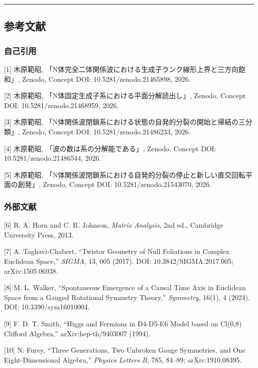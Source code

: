 \documentclass[
  a4paper,
]{ltjsarticle}
\begin{document}
\begin{center}\rule{0.5\linewidth}{0.5pt}\end{center}

\subsection{参考文献}\label{ux53c2ux8003ux6587ux732e}

\subsubsection{自己引用}\label{ux81eaux5df1ux5f15ux7528}

{[}1{]} 木原範昭,
「N体完全二体関係波における生成子ランク線形上界と三方向飽和」, Zenodo,
Concept DOI: 10.5281/zenodo.21465898, 2026.

{[}2{]} 木原範昭, 「N体固定生成子系における平面分解読出し」, Zenodo,
Concept DOI: 10.5281/zenodo.21468959, 2026.

{[}3{]} 木原範昭,
「N体関係波閉鎖系における状態の自発的分裂の開始と帰結の三分類」, Zenodo,
Concept DOI: 10.5281/zenodo.21486233, 2026.

{[}4{]} 木原範昭, 「波の数は系の分解能である」, Zenodo, Concept DOI:
10.5281/zenodo.21486544, 2026.

{[}5{]} 木原範昭,
「N体関係波閉鎖系における自発的分裂の停止と新しい直交回転平面の創発」,
Zenodo, Concept DOI: 10.5281/zenodo.21543070, 2026.

\subsubsection{外部文献}\label{ux5916ux90e8ux6587ux732e}

{[}6{]} R. A. Horn and C. R. Johnson, \emph{Matrix Analysis}, 2nd ed.,
Cambridge University Press, 2013.

{[}7{]} A. Taghavi-Chabert, ``Twistor Geometry of Null Foliations in
Complex Euclidean Space,'' \emph{SIGMA}, 13, 005 (2017). DOI:
10.3842/SIGMA.2017.005; arXiv:1505.06938.

{[}8{]} M. L. Walker, ``Spontaneous Emergence of a Causal Time Axis in
Euclidean Space from a Gauged Rotational Symmetry Theory,''
\emph{Symmetry}, 16(1), 4 (2024). DOI: 10.3390/sym16010004.

{[}9{]} F. D. T. Smith, ``Higgs and Fermions in D4-D5-E6 Model based on
Cl(0,8) Clifford Algebra,'' arXiv:hep-th/9403007 (1994).

{[}10{]} N. Furey, ``Three Generations, Two Unbroken Gauge Symmetries,
and One Eight-Dimensional Algebra,'' \emph{Physics Letters B}, 785,
84--89; arXiv:1910.08395.
\end{document}

